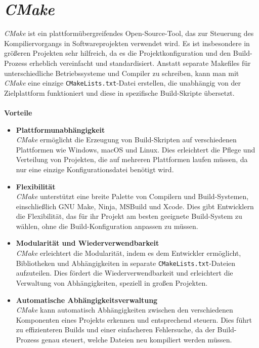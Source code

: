 \section{\textit{CMake}}
\label{sec:tooling-cmake}
\textit{CMake} ist ein plattformübergreifendes Open-Source-Tool, das zur Steuerung des Kompiliervorgangs in Softwareprojekten verwendet wird.
Es ist insbesondere in größeren Projekten sehr hilfreich, da es die Projektkonfiguration und den Build-Prozess erheblich vereinfacht und standardisiert.
Anstatt separate Makefiles für unterschiedliche Betriebssysteme und Compiler zu schreiben, kann man mit \textit{CMake} eine einzige \texttt{CMakeLists.txt}-Datei erstellen, die unabhängig von der Zielplattform funktioniert und diese in spezifische Build-Skripte übersetzt. \cite{Cmake2024}\\\\
\textbf{Vorteile}
\begin{itemize}
    \item \textbf{Plattformunabhängigkeit}\\
    \textit{CMake} ermöglicht die Erzeugung von Build-Skripten auf verschiedenen Plattformen wie Windows, macOS und Linux.
    Dies erleichtert die Pflege und Verteilung von Projekten, die auf mehreren Plattformen laufen müssen, da nur eine einzige Konfigurationsdatei benötigt wird.
    \item \textbf{Flexibilität}\\
    \textit{CMake} unterstützt eine breite Palette von Compilern und Build-Systemen, einschließlich GNU Make, Ninja, MSBuild und Xcode.
    Dies gibt Entwicklern die Flexibilität, das für ihr Projekt am besten geeignete Build-System zu wählen, ohne die Build-Konfiguration anpassen zu müssen.
    \item \textbf{Modularität und Wiederverwendbarkeit}\\
    \textit{CMake} erleichtert die Modularität, indem es dem Entwickler ermöglicht, Bibliotheken und Abhängigkeiten in separate \texttt{CMakeLists.txt}-Dateien aufzuteilen.
    Dies fördert die Wiederverwendbarkeit und erleichtert die Verwaltung von Abhängigkeiten, speziell in großen Projekten.
    \item \textbf{Automatische Abhängigkeitsverwaltung}\\
    \textit{CMake} kann automatisch Abhängigkeiten zwischen den verschiedenen Komponenten eines Projekts erkennen und entsprechend steuern.
    Dies führt zu effizienteren Builds und einer einfacheren Fehlersuche, da der Build-Prozess genau steuert, welche Dateien neu kompiliert werden müssen.
\end{itemize}

